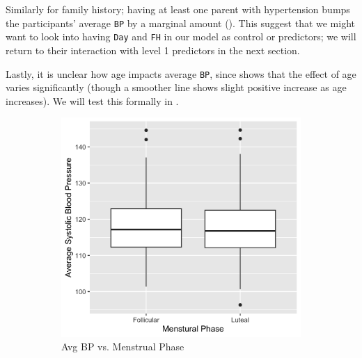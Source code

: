 \documentclass[12pt,twoside,leqno,fleqn,letterpaper]{article}
\theoremstyle{definition}
\theoremstyle{definition}
\begin{document}
Similarly for family history; having at least one parent with hypertension bumps the participants' average \texttt{BP} by a marginal amount (). This suggest that we might want to look into having \texttt{Day} and \texttt{FH} in our model as control or predictors; we will return to their interaction with level 1 predictors in the next section. 

Lastly, it is unclear how age impacts average \texttt{BP}, since  shows that the effect of age varies significantly (though a smoother line shows slight positive increase as age increases). We will test this formally in .

\begin{figure} 
    \centering
    \begin{subfigure}{0.48\textwidth}
        \centering
        \includegraphics[width=\textwidth]{pics/bp v phase.png}
        \caption{{\small Avg BP vs. Menstrual Phase}}
        \label{fig: bp v phase}
    \end{subfigure}
    \hfill
    \begin{subfigure}{0.48\textwidth}
        \centering

\end{subfigure}
\end{figure}
\end{document}
